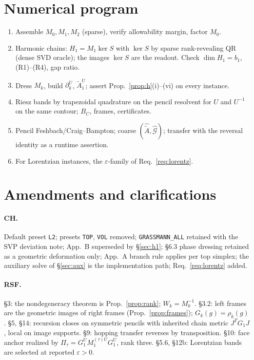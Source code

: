 \documentclass[11pt]{article}
\theoremstyle{definition}
\theoremstyle{plain}
\theoremstyle{remark}
\newcommand{\bd}{\partial}
\newcommand{\Tr}{^{T}}
\newcommand{\ttt}[1]{\texttt{#1}}
\newcommand{\At}{\widetilde{A}}
\begin{document}
\section{Numerical program}\label{sec:program}
\begin{enumerate}[nosep]
\item Assemble \(M_0,M_1,M_2\) (sparse), verify allowability margin, factor \(M_0\).
\item Harmonic chains: \(H_1=M_1\ker S\) with \(\ker S\) by sparse rank-revealing QR (dense SVD oracle); the images \(\ker S\) are the readout. Check \(\dim H_1=b_1\), (R1)--(R4), gap ratio.
\item Dress \(M_k\), build \(\bd_k^{U}\), \(\At_1^{U}\); assert Prop.~\ref{prop:h}(i)--(vi) on every instance.
\item Riesz bands by trapezoidal quadrature on the pencil resolvent for \(U\) and \(U^{-1}\) on the same contour; \(B_C\), frames, certificates.
\item Pencil Feshbach/Craig--Bampton; coarse \((\hat{\At},\hat{\mathcal G})\); transfer with the reversal identity as a runtime assertion.
\item For Lorentzian instances, the \(\varepsilon\)-family of Req.~\ref{req:lorentz}.
\end{enumerate}

\section{Amendments and clarifications}\label{sec:amend}
\paragraph{CH.} Default preset \ttt{L2}; presets \ttt{TOP}, \ttt{VOL} removed; \ttt{GRASSMANN\_ALL} retained with the SVP deviation note; App.~B superseded by \S\ref{sec:h1}; \S6.3 phase dressing retained as a geometric deformation only; App.~A branch rule applies per top simplex; the auxiliary solve of \S\ref{sec:aux} is the implementation path; Req.~\ref{req:lorentz} added.
\paragraph{RSF.} \S3: the nondegeneracy theorem is Prop.~\ref{prop:rank}; \(W_k=M_k^{-1}\). \S3.2: left frames are the geometric images of right frames (Prop.~\ref{prop:frames}); \(G_k(g)=\rho_k(g)\). \S5, \S14: recursion closes on symmetric pencils with inherited chain metric \(J\Tr G_1J\), local on image supports. \S9: hopping transfer reverses by transposition. \S10: face anchor realized by \(\Pi_\tau=G_1^{U}M_1^{(\tau)U}G_1^{U}\), rank three. \S5.6, \S12b: Lorentzian bands are selected at reported \(\varepsilon>0\).
\end{document}
